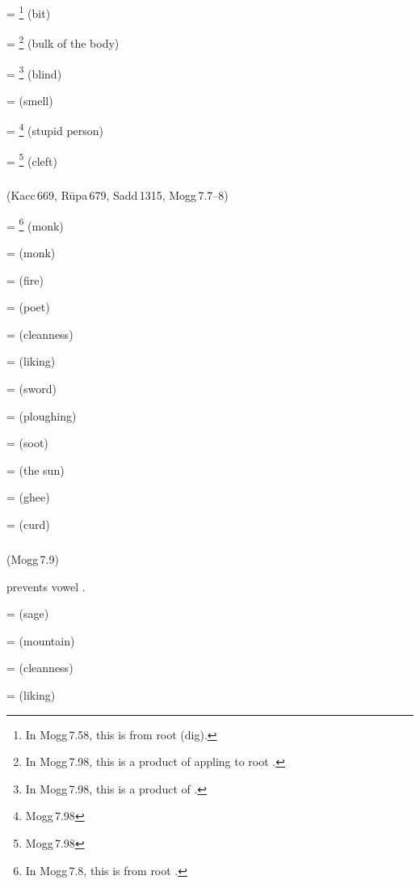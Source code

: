  = \footnote{In Mogg\,7.58, this is from root  (dig).} (bit)\par
{} = \footnote{In Mogg\,7.98, this is a product of  appling to root .} (bulk of the body)\par
{} = \footnote{In Mogg\,7.98, this is a product of .} (blind)\par
{} =  (smell)\par
{} = \footnote{Mogg\,7.98} (stupid person)\par
{} = \footnote{Mogg\,7.98} (cleft)\par

\subparagraph*{} (Kacc\,669, R\=upa\,679, Sadd\,1315, Mogg\,7.7--8)\label{pacckx:i}

 = \footnote{In Mogg\,7.8, this is from root .} (monk)\par
{} =  (monk)\par
{} =  (fire)\par
{} =  (poet)\par
{} =  (cleanness)\par
{} =  (liking)\par
{} =  (sword)\par
{} =  (ploughing)\par
{} =  (soot)\par
{} =  (the sun)\par
{} =  (ghee)\par
{} =  (curd)\par

\subparagraph*{} (Mogg\,7.9)\label{pacckx:ki}

 prevents vowel .

 =  (sage)\par
{} =  (mountain)\par
{} =  (cleanness)\par
{} =  (liking)\par


